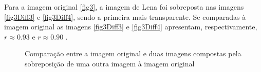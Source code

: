 \documentclass[10pt,a4paper]{article}
\begin{document}
\vspace{-0.5cm}
Para a imagem original \ref{fig3}, a imagem de Lena foi sobreposta nas
imagens \ref{fig3Diff3} e \ref{fig3Diff4}, sendo a primeira mais
transparente.
Se comparadas à imagem original as imagens \ref{fig3Diff3} e
\ref{fig3Diff4} apresentam, respectivamente, $r\approx 0.93$ e
$r\approx 0.90$ . 
\begin{figure}[h!]
  \begin{center}
    \hspace{10mm}
    \caption{Comparação entre a imagem original e duas imagens compostas pela sobreposição
      de uma outra imagem à imagem original}
  \end{center}
\end{figure}
\end{document}
